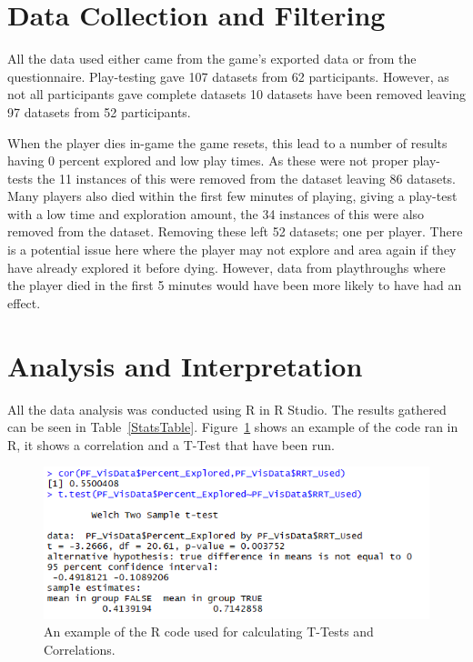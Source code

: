 \documentclass[journal]{IEEEtran}
\begin{document}
	\section{Data Collection and Filtering}  \label{datacollection}
	All the data used either came from the game's exported data or from the questionnaire.  Play-testing gave 107 datasets from 62 participants. However, as not all participants gave complete datasets 10 datasets have been removed leaving 97 datasets from 52 participants. 
	
	When the player dies in-game the game resets, this lead to a number of results having 0 percent explored and low play times. As these were not proper play-tests the 11 instances of this were removed from the dataset leaving 86 datasets. Many players also died within the first few minutes of playing, giving a play-test with a low time and exploration amount, the 34 instances of this were also removed from the dataset. Removing these left 52 datasets; one per player. There is a potential issue here where the player may not explore and area again if they have already explored it before dying. However, data from playthroughs where the player died in the first 5 minutes would have been more likely to have had an effect. 
	
	\section{Analysis and Interpretation} \label{Analysis}
	All the data analysis was conducted using R in R Studio. The results gathered can be seen in Table~\ref{StatsTable}.  Figure~\ref{image:RCor} shows an example of the code ran in R, it shows a correlation and a T-Test that have been run. 
	
	\begin{figure}[h]
		\includegraphics[width=1.0\linewidth]{RCor.png}
		\caption{An example of the R code used for calculating T-Tests and Correlations.}
		\label{image:RCor}
	\end{figure}  
	
\end{document}
